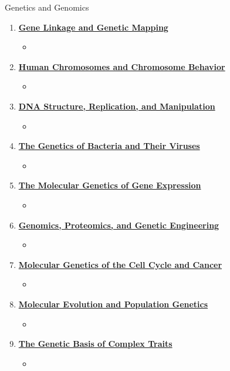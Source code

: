 \documentclass[12pt,letterpaper]{article}
\begin{document}
\begin{chapbox}{Genetics and Genomics}
{\begin{enumerate}[font=\bfseries, wide]
\begin{itemize}
    \end{itemize}
    \item \hyperlink{4}{\textbf{Gene Linkage and
    Genetic Mapping}}
    \begin{itemize}
        \item 
    \end{itemize}
    \item \hyperlink{5}{\textbf{Human Chromosomes and
    Chromosome Behavior}}
    \begin{itemize}
        \item 
    \end{itemize}
    \item \hyperlink{6}{\textbf{DNA Structure, Replication,
    and Manipulation}}
    \begin{itemize}
        \item 
    \end{itemize}
    \item \hyperlink{7}{\textbf{The Genetics of Bacteria
    and Their Viruses}}
    \begin{itemize}
        \item 
    \end{itemize}
    \item \hyperlink{8}{\textbf{The Molecular Genetics
    of Gene Expression}}
    \begin{itemize}
        \item 
    \end{itemize}
    \item \hyperlink{10}{\textbf{Genomics, Proteomics, and
    Genetic Engineering}}
    \begin{itemize}
        \item 
    \end{itemize}
    \item \hyperlink{13}{\textbf{Molecular Genetics of the
    Cell Cycle and Cancer}}
    \begin{itemize}
        \item 
    \end{itemize}    
    \item \hyperlink{14}{\textbf{Molecular Evolution
    and Population Genetics}}
    \begin{itemize}
        \item 
    \end{itemize}
    \item \hyperlink{15}{\textbf{The Genetic Basis of
    Complex Traits}}
    \begin{itemize}
        \item 
    \end{itemize}
\end{enumerate}
}\end{chapbox}
\end{document}
